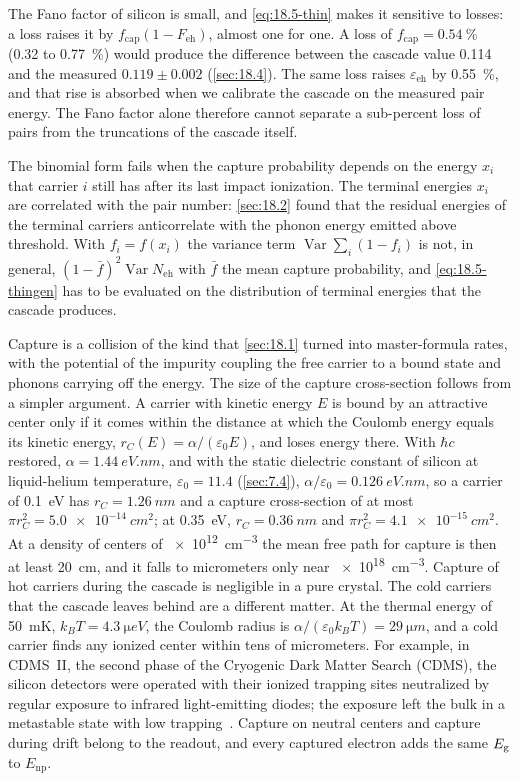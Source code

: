 The Fano factor of silicon is small, and \cref{eq:18.5-thin} makes it sensitive to losses: a loss raises it by $f_{\mathrm{cap}}(1 - F_{\mathrm{eh}})$, almost one for one. A loss of $f_{\mathrm{cap}} = \SI{0.54}{\percent}$ (0.32 to \SI{0.77}{\percent}) would produce the difference between the cascade value 0.114 and the measured $0.119 \pm 0.002$ (\cref{sec:18.4}). The same loss raises $\varepsilon_{\mathrm{eh}}$ by \SI{0.55}{\percent}, and that rise is absorbed when we calibrate the cascade on the measured pair energy. The Fano factor alone therefore cannot separate a sub-percent loss of pairs from the truncations of the cascade itself.

The binomial form fails when the capture probability depends on the energy $x_i$ that carrier $i$ still has after its last impact ionization. The terminal energies $x_i$ are correlated with the pair number: \cref{sec:18.2} found that the residual energies of the terminal carriers anticorrelate with the phonon energy emitted above threshold. With $f_i = f(x_i)$ the variance term $\operatorname{Var}\sum_i(1 - f_i)$ is not, in general, $(1 - \bar f)^2\operatorname{Var}N_{\mathrm{eh}}$ with $\bar f$ the mean capture probability, and \cref{eq:18.5-thingen} has to be evaluated on the distribution of terminal energies that the cascade produces.

Capture is a collision of the kind that \cref{sec:18.1} turned into master-formula rates, with the potential of the impurity coupling the free carrier to a bound state and phonons carrying off the energy. The size of the capture cross-section follows from a simpler argument. A carrier with kinetic energy $E$ is bound by an attractive center only if it comes within the distance at which the Coulomb energy equals its kinetic energy, $r_C(E) = \alpha/(\varepsilon_0E)$, and loses energy there. With $\hbar c$ restored, $\alpha = \SI{1.44}{eV.nm}$, and with the static dielectric constant of silicon at liquid-helium temperature, $\varepsilon_0 = 11.4$ (\cref{sec:7.4}), $\alpha/\varepsilon_0 = \SI{0.126}{eV.nm}$, so a carrier of \SI{0.1}{eV} has $r_C = \SI{1.26}{nm}$ and a capture cross-section of at most $\pi r_C^2 = \SI{5.0e-14}{cm^2}$; at \SI{0.35}{eV}, $r_C = \SI{0.36}{nm}$ and $\pi r_C^2 = \SI{4.1e-15}{cm^2}$. At a density of centers of \SI{e12}{cm^{-3}} the mean free path for capture is then at least \SI{20}{cm}, and it falls to micrometers only near \SI{e18}{cm^{-3}}. Capture of hot carriers during the cascade is negligible in a pure crystal. The cold carriers that the cascade leaves behind are a different matter. At the thermal energy of \SI{50}{mK}, $k_BT = \SI{4.3}{\micro eV}$, the Coulomb radius is $\alpha/(\varepsilon_0k_BT) = \SI{29}{\micro m}$, and a cold carrier finds any ionized center within tens of micrometers. For example, in CDMS~II, the second phase of the Cryogenic Dark Matter Search (CDMS), the silicon detectors were operated with their ionized trapping sites neutralized by regular exposure to infrared light-emitting diodes; the exposure left the bulk in a metastable state with low trapping~\cite[Sect.~2]{agnese2018nuclear}. Capture on neutral centers and capture during drift belong to the readout, and every captured electron adds the same $E_{\mathrm{g}}$ to $E_{\mathrm{np}}$.

